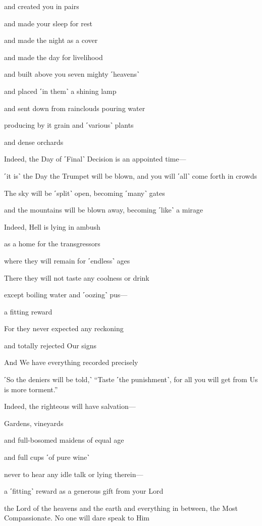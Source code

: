 and created you in pairs

and made your sleep for rest

and made the night as a cover

and made the day for livelihood

and built above you seven mighty ˹heavens˺

and placed ˹in them˺ a shining lamp

and sent down from rainclouds pouring water

producing by it grain and ˹various˺ plants

and dense orchards

Indeed, the Day of ˹Final˺ Decision is an appointed time—

˹it is˺ the Day the Trumpet will be blown, and you will ˹all˺ come forth in crowds

The sky will be ˹split˺ open, becoming ˹many˺ gates

and the mountains will be blown away, becoming ˹like˺ a mirage

Indeed, Hell is lying in ambush

as a home for the transgressors

where they will remain for ˹endless˺ ages

There they will not taste any coolness or drink

except boiling water and ˹oozing˺ pus—

a fitting reward

For they never expected any reckoning

and totally rejected Our signs

And We have everything recorded precisely

˹So the deniers will be told,˺ “Taste ˹the punishment˺, for all you will get from Us is more torment.”

Indeed, the righteous will have salvation—

Gardens, vineyards

and full-bosomed maidens of equal age

and full cups ˹of pure wine˺

never to hear any idle talk or lying therein—

a ˹fitting˺ reward as a generous gift from your Lord

the Lord of the heavens and the earth and everything in between, the Most Compassionate. No one will dare speak to Him

